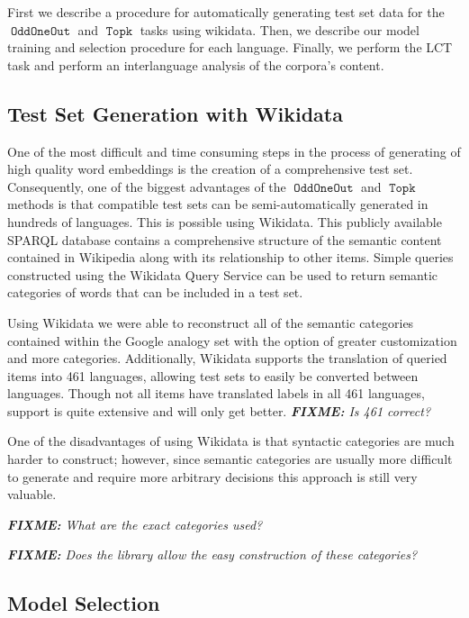\documentclass[11pt,a4paper]{article}
\DeclareMathOperator{\OddOneOut}{\texttt{OddOneOut}}
\DeclareMathOperator{\topk}{\texttt{Topk}}
\newcommand{\fixme}[1]{{\color{red}\itshape \textbf{FIXME:} {#1}}}
\begin{document}
First we describe a procedure for automatically generating test set data for the $\OddOneOut$ and $\topk$ tasks using wikidata.
Then, we describe our model training and selection procedure for each language.
Finally, we perform the LCT task and perform an interlanguage analysis of the corpora's content.

\subsection{Test Set Generation with Wikidata}

One of the most difficult and time consuming steps in the process of generating of high quality word embeddings is the creation of a comprehensive test set.
 Consequently, one of the biggest advantages of the $\OddOneOut$ and $\topk$ methods is that compatible test sets can be semi-automatically generated in hundreds of languages.
This is possible using Wikidata. 
This publicly available SPARQL database contains a comprehensive structure of the semantic content contained in Wikipedia
along with its relationship to other items.
Simple queries constructed using the Wikidata Query Service can be used to return semantic categories of words that can be included in a test set.

Using Wikidata we were able to reconstruct all of the semantic categories contained within the Google analogy set with the option of greater customization and more categories.
Additionally, Wikidata supports the translation of queried items into 461 languages, allowing test sets to easily be converted between languages.
Though not all items have translated labels in all 461 languages, support is quite extensive and will only get better. 
\fixme{Is 461 correct?}

One of the disadvantages of using Wikidata is that syntactic categories are much harder to construct;
however, since semantic categories are usually more difficult to generate 
and require more arbitrary decisions this approach is still very valuable.

\fixme{What are the exact categories used?}

\fixme{Does the library allow the easy construction of these categories?}

\subsection{Model Selection}
\end{document}
